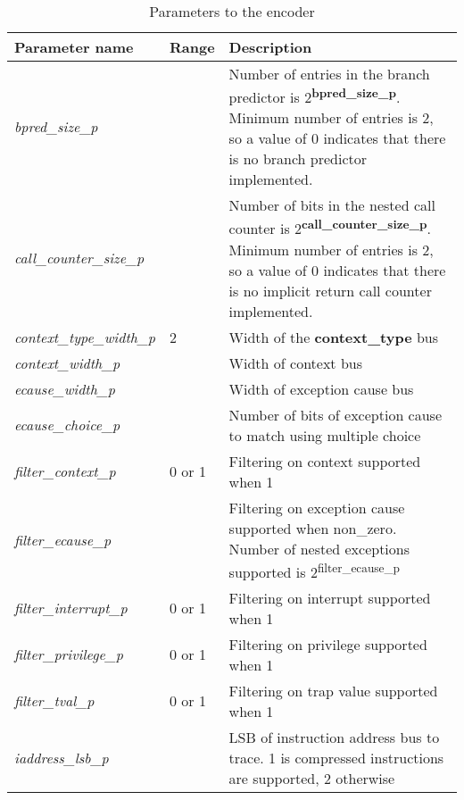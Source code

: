 \FloatBarrier
\begin{table}[h]
    \centering
    \caption{Parameters to the encoder}
    \label{tab:parameters}
    \begin{tabulary}{\textwidth}{|l|p{25mm}|p{80mm}|}
        \hline
        \textbf{Parameter name} & \textbf{Range} & \textbf{Description} \\
        \hline
        \textit{bpred\_size\_p} & & Number of entries in the branch predictor is 2\textsuperscript{\textbf{bpred\_size\_p}}. 
                                    Minimum number of entries is 2, so a value of 0 indicates that there is no branch predictor implemented.\\
        \hline
        \textit{call\_counter\_size\_p} &  & Number of bits in the nested call counter is 2\textsuperscript{\textbf{call\_counter\_size\_p}}.
                                    Minimum number of entries is 2, so a value of 0 indicates that there is no implicit return call counter implemented.\\
        \hline
        \textit{context\_type\_width\_p} & 2 & Width of the \textbf{context\_type} bus\\
        \hline
        \textit{context\_width\_p} &  & Width of context bus \\
        \hline
        \textit{ecause\_width\_p} &  & Width of exception cause bus \\
        \hline
        \textit{ecause\_choice\_p} & & Number of bits of exception cause to match using multiple choice \\
        \hline
        \textit{filter\_context\_p} & 0 or 1 & Filtering on context supported when 1 \\
        \hline
        \textit{filter\_ecause\_p} & & Filtering on exception cause supported when non\_zero.  Number of nested exceptions supported is 2\textsuperscript{filter\_ecause\_p} \\
        \hline
        \textit{filter\_interrupt\_p} & 0 or 1 & Filtering on interrupt supported when 1 \\
        \hline
        \textit{filter\_privilege\_p} & 0 or 1 & Filtering on privilege supported when 1 \\
        \hline
        \textit{filter\_tval\_p} & 0 or 1 & Filtering on trap value supported when 1 \\
        \hline
        \textit{iaddress\_lsb\_p} & & LSB of instruction address bus to trace.  1 is compressed instructions are supported, 2 otherwise\\

\end{tabulary}
\end{table}
